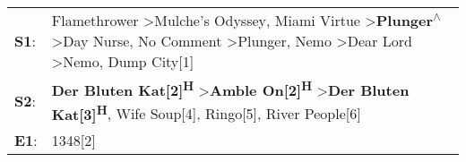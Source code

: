 \begin{supertabular}{p{0.03\textwidth}p{0.92\textwidth}}
 \textbf{S1}:  &  Flamethrower\textsuperscript{} \textgreater \enspace Mulche's Odyssey\textsuperscript{}, \enspace Miami Virtue\textsuperscript{} \textgreater \enspace \textbf{Plunger\textsuperscript{$\wedge$}} \textgreater \enspace Day Nurse\textsuperscript{}, \enspace No Comment\textsuperscript{} \textgreater \enspace Plunger\textsuperscript{}, \enspace Nemo\textsuperscript{} \textgreater \enspace Dear Lord\textsuperscript{} \textgreater \enspace Nemo\textsuperscript{}, \enspace Dump City[1]\textsuperscript{}  \enspace  \\
 \textbf{S2}:  &                                                                                                                                                                                                            \textbf{Der Bluten Kat[2]\textsuperscript{H}} \textgreater \enspace \textbf{Amble On[2]\textsuperscript{H}} \textgreater \enspace \textbf{Der Bluten Kat[3]\textsuperscript{H}}, \enspace Wife Soup[4]\textsuperscript{}, \enspace Ringo[5]\textsuperscript{}, \enspace River People[6]\textsuperscript{}  \enspace  \\
 \textbf{E1}:  &                                                                                                                                                                                                                                                                                                                                                                                                                                                                                            1348[2]\textsuperscript{}  \enspace  \\
\end{supertabular}
